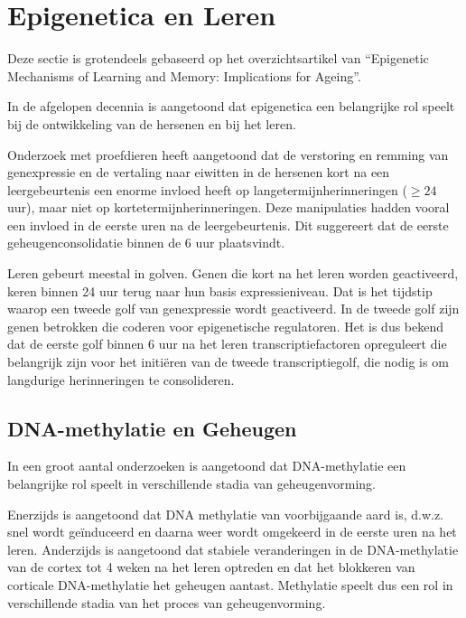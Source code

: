 \documentclass[
  11pt,
]{book}
\begin{document}
\section{Epigenetica en Leren}\label{epigenetica-en-leren}

Deze sectie is grotendeels gebaseerd op het overzichtsartikel van \citet{Creighton2020} ``Epigenetic Mechanisms of Learning and Memory: Implications for Ageing''.

In de afgelopen decennia is aangetoond dat epigenetica een belangrijke rol speelt bij de ontwikkeling van de hersenen en bij het leren.

Onderzoek met proefdieren heeft aangetoond dat de verstoring en remming van genexpressie en de vertaling naar eiwitten in de hersenen kort na een leergebeurtenis een enorme invloed heeft op langetermijnherinneringen (\(\geq24\) uur), maar niet op kortetermijnherinneringen. Deze manipulaties hadden vooral een invloed in de eerste uren na de leergebeurtenis. Dit suggereert dat de eerste geheugenconsolidatie binnen de 6 uur plaatsvindt.

Leren gebeurt meestal in golven. Genen die kort na het leren worden geactiveerd, keren binnen 24 uur terug naar hun basis expressieniveau. Dat is het tijdstip waarop een tweede golf van genexpressie wordt geactiveerd.
In de tweede golf zijn genen betrokken die coderen voor epigenetische regulatoren.
Het is dus bekend dat de eerste golf binnen 6 uur na het leren transcriptiefactoren opreguleert die belangrijk zijn voor het initiëren van de tweede transcriptiegolf, die nodig is om langdurige herinneringen te consolideren.

\subsection{DNA-methylatie en Geheugen}\label{dna-methylatie-en-geheugen}

In een groot aantal onderzoeken is aangetoond dat DNA-methylatie een belangrijke rol speelt in verschillende stadia van geheugenvorming.

Enerzijds is aangetoond dat DNA methylatie van voorbijgaande aard is, d.w.z. snel wordt geïnduceerd en daarna weer wordt omgekeerd in de eerste uren na het leren. Anderzijds is aangetoond dat stabiele veranderingen in de DNA-methylatie van de cortex tot 4 weken na het leren optreden en dat het blokkeren van corticale DNA-methylatie het geheugen aantast.
Methylatie speelt dus een rol in verschillende stadia van het proces van geheugenvorming.
\end{document}
